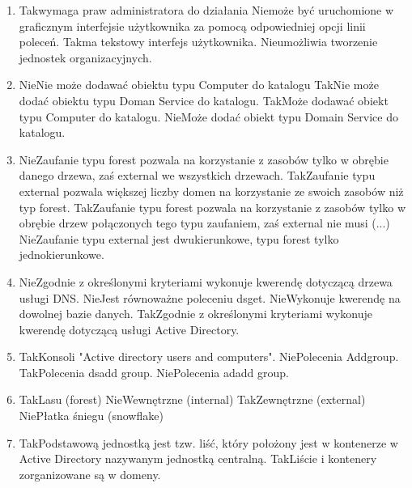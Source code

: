 \begin{enumerate}
		{Nie}{Nie ma możliwości nadania określonemu użytkownikowi praw do zarządzania użytkownikami w jednostce organizacyjnej bez nadawania (...)}%
		{Tak}{Możliwe jest kopiowanie użytkowników.}
		\item {}%
		{Tak}{wymaga praw administratora do działania}%
		{Nie}{może być uruchomione w graficznym interfejsie użytkownika za pomocą odpowiedniej opcji linii poleceń.}%
		{Tak}{ma tekstowy interfejs użytkownika.}%
		{Nie}{umożliwia tworzenie jednostek organizacyjnych.}
		\item {}%
		{Nie}{Nie może dodawać obiektu typu Computer do katalogu}%
		{Tak}{Nie może dodać obiektu typu Doman Service do katalogu.}%
		{Tak}{Może dodawać obiekt typu Computer do katalogu.}%
		{Nie}{Może dodać obiekt typu Domain Service do katalogu.}
		\item {}%
		{Nie}{Zaufanie typu forest pozwala na korzystanie z zasobów tylko w obrębie danego drzewa, zaś external we wszystkich drzewach.}%
		{Tak}{Zaufanie typu external pozwala większej liczby domen na korzystanie ze swoich zasobów niż typ forest.}%
		{Tak}{Zaufanie typu forest pozwala na korzystanie z zasobów tylko w obrębie drzew połączonych tego typu zaufaniem, zaś external nie musi (...)}%
		{Nie}{Zaufanie typu external jest dwukierunkowe, typu forest tylko jednokierunkowe.}
		\newpage
		\item {}%
		{Nie}{Zgodnie z określonymi kryteriami wykonuje kwerendę dotyczącą drzewa usługi DNS.}%
		{Nie}{Jest równoważne poleceniu dsget.}%
		{Nie}{Wykonuje kwerendę na dowolnej bazie danych.}%
		{Tak}{Zgodnie z określonymi kryteriami wykonuje kwerendę dotyczącą usługi Active Directory.}
		\item {}%
		{Tak}{Konsoli "Active directory users and computers".}%
		{Nie}{Polecenia Addgroup.}%
		{Tak}{Polecenia dsadd group.}%
		{Nie}{Polecenia adadd group.}
		\item {}%
		{Tak}{Lasu (forest)}%
		{Nie}{Wewnętrzne (internal)}%
		{Tak}{Zewnętrzne (external)}%
		{Nie}{Płatka śniegu (snowflake)}
		\item {}%
		{Tak}{Podstawową jednostką jest tzw. liść, który położony jest w kontenerze w Active Directory nazywanym jednostką centralną.}%
		{Tak}{Liście i kontenery zorganizowane są w domeny.}%

\end{enumerate}
